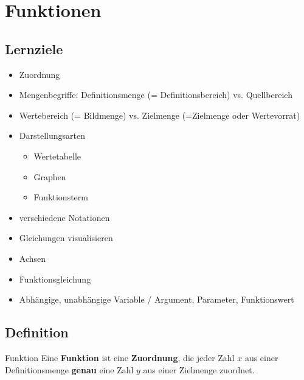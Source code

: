 
\section{Funktionen}
\subsection*{Lernziele}

\begin{itemize}
 \item Zuordnung
 \item Mengenbegriffe: Definitionsmenge (= Definitionsbereich) vs. Quellbereich
 \item Wertebereich (= Bildmenge) vs. Zielmenge
   (=Zielmenge oder Wertevorrat)
 \item Darstellungsarten
   \begin{itemize}
      \item Wertetabelle
      \item Graphen
      \item Funktionsterm
   \end{itemize}
 \item verschiedene Notationen
 \item Gleichungen visualisieren
 \item Achsen
 \item Funktionsgleichung
 \item Abhängige, unabhängige Variable / Argument, Parameter, Funktionswert
\end{itemize}


\newpage
\subsection{Definition}
\begin{definition}{Funktion}{}
    Eine \textbf{Funktion} ist eine \textbf{Zuordnung}, die jeder Zahl
    $x$ aus einer Definitionsmenge \textbf{genau} eine Zahl $y$ aus
    einer Zielmenge zuordnet.\\
\end{definition}
    
